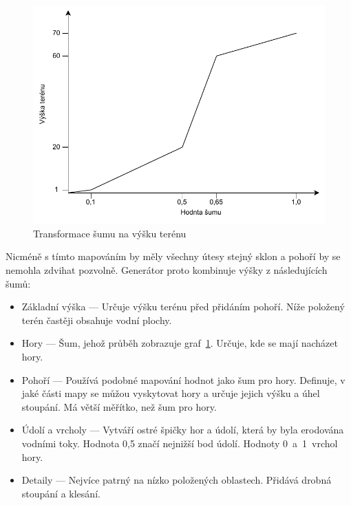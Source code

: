 \documentclass[thesis=M,czech]{FITthesis}[2019/12/23]
\begin{document}
\begin{figure}\centering
	\includegraphics[width=\textwidth]{images/world_gen/noise_to_height}
	\caption[Transformace šumu na výšku terénu]{Transformace šumu na výšku terénu}\label{fig:noise_to_height}
\end{figure}

Nicméně s tímto mapováním by měly všechny útesy stejný sklon a pohoří by se nemohla zdvihat pozvolně. Generátor proto kombinuje výšky z následu\-jí\-cích šumů:

\begin{itemize}
\item Základní výška --- Určuje výšku terénu před přidáním pohoří. Níže položený terén častěji obsahuje vodní plochy.

\item Hory --- Šum, jehož průběh zobrazuje graf~\ref{fig:noise_to_height}. Určuje, kde se mají nacházet hory.

\item Pohoří --- Používá podobné mapování hodnot jako šum pro hory. Definuje, v jaké části mapy se můžou vyskytovat hory a určuje jejich výšku a úhel stoupání. Má větší měřítko, než šum pro hory. 

\item Údolí a vrcholy --- Vytváří ostré špičky hor a údolí, která by byla erodována vodními toky. Hodnota 0,5 značí nejnižší bod údolí. Hodnoty 0~a~1~vrchol hory.

\item Detaily --- Nejvíce patrný na nízko položených oblastech. Přidává drobná stoupání a klesání.
\end{itemize}
\end{document}
